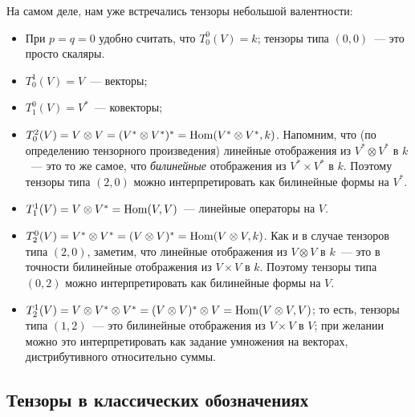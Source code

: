 На самом деле, нам уже встречались тензоры небольшой валентности:
\begin{itemize}
\item При $p=q=0$ удобно считать, что $T^0_0(V) = k$; тензоры типа
  $(0,0)$~--- это просто скаляры.
\item $T^1_0(V)=V$~--- векторы;
\item $T^0_1(V)=V^*$~--- ковекторы;
\item $T^2_0(V) = V\otimes V = (V^*\otimes V^*)^* = \operatorname{Hom}(V^*\otimes
  V^*,k)$. Напомним, что (по определению тензорного произведения)
  линейные отображения из $V^*\otimes V^*$ в $k$~--- это то же самое, что
  {\em билинейные} отображения из $V^*\times V^*$ в $k$. Поэтому тензоры
  типа $(2,0)$ можно интерпретировать как билинейные формы на $V^*$.
\item $T^1_1(V) = V\otimes V^* = \operatorname{Hom}(V,V)$~--- линейные операторы на
  $V$.
\item $T^0_2(V) = V^*\otimes V^* = (V\otimes V)^* = \operatorname{Hom}(V\otimes
  V,k)$. Как и в случае тензоров типа $(2,0)$, заметим, что линейные
  отображения из $V\otimes V$ в $k$~--- это в точности билинейные
  отображения из $V\times V$ в $k$. Поэтому тензоры типа $(0,2)$ можно
  интерпретировать как билинейные формы на $V$.
\item $T^1_2(V) = V\otimes V^*\otimes V^* = (V\otimes V)^*\otimes V =
  \operatorname{Hom}(V\otimes V,V)$; то есть, тензоры типа $(1,2)$~--- это
  билинейные отображения из $V\times V$ в $V$; при желании можно это
  интерпретировать как задание умножения на векторах,
  дистрибутивного относительно суммы.
\end{itemize}

\subsection{Тензоры в классических обозначениях}



